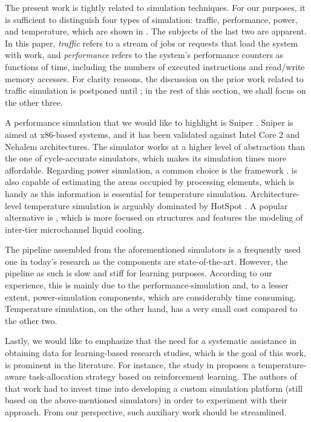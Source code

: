 The present work is tightly related to simulation techniques. For our purposes,
it is sufficient to distinguish four types of simulation: traffic, performance,
power, and temperature, which are shown in . The subjects of
the last two are apparent. In this paper, \emph{traffic} refers to a stream of
jobs or requests that load the system with work, and \emph{performance} refers
to the system's performance counters as functions of time, including the numbers
of executed instructions and read/write memory accesses. For clarity reasons,
the discussion on the prior work related to traffic simulation is postponed
until ; in the rest of this section, we shall focus on the other
three.

A performance simulation that we would like to highlight is Sniper
\cite{carlson2011}. Sniper is aimed at x86-based systems, and it has been
validated against Intel Core 2 and Nehalem architectures. The simulator works at
a higher level of abstraction than the one of cycle-accurate simulators, which
makes its simulation times more affordable. Regarding power simulation, a common
choice is the  framework \cite{li2009}.  is also capable of
estimating the areas occupied by processing elements, which is handy as this
information is essential for temperature simulation. Architecture-level
temperature simulation is arguably dominated by HotSpot \cite{skadron2004}. A
popular alternative is  \cite{sridhar2010}, which is more focused on
 structures and features the modeling of inter-tier microchannel liquid
cooling.

The pipeline assembled from the aforementioned simulators is a frequently used
one in today's research as the components are state-of-the-art. However, the
pipeline as such is slow and stiff for learning purposes. According to our
experience, this is mainly due to the performance-simulation and, to a lesser
extent, power-simulation components, which are considerably time consuming.
Temperature simulation, on the other hand, has a very small cost compared to the
other two.

Lastly, we would like to emphasize that the need for a systematic assistance in
obtaining data for learning-based research studies, which is the goal of this
work, is prominent in the literature. For instance, the study in \cite{lu2015}
proposes a temperature-aware task-allocation strategy based on reinforcement
learning. The authors of that work had to invest time into developing a custom
simulation platform (still based on the above-mentioned simulators) in order to
experiment with their approach. From our perspective, such auxiliary work should
be streamlined.
